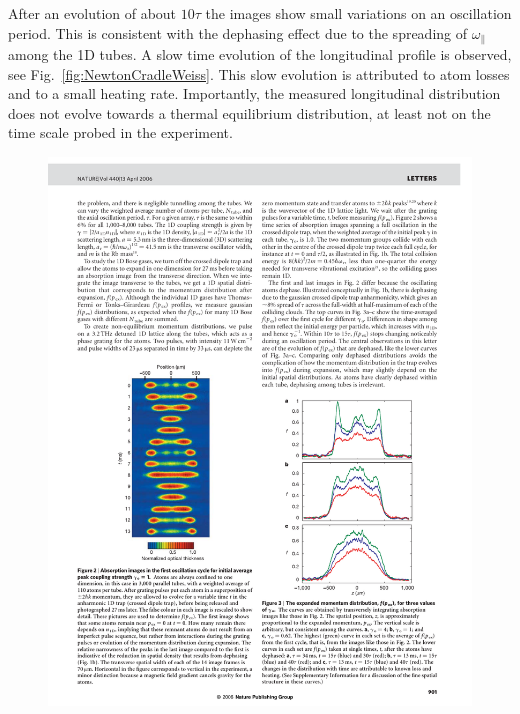 \documentclass[onecolumn,amsfonts,showpacs,superscriptaddress]{revtex4-1}
\begin{document}
After an evolution of about $10\tau$ the images show small variations on an oscillation period. This is consistent with the dephasing effect 
due to the spreading of $\omega_\parallel$ among the 1D tubes. A slow time evolution of the longitudinal profile is observed, see Fig.~\ref{fig:NewtonCradleWeiss}. 
This slow evolution is attributed to atom losses and to a small heating rate. 
Importantly, the measured longitudinal distribution does not evolve towards a thermal equilibrium distribution, at least not on the time scale probed in the experiment. 

\begin{figure}
    \centering
    \includegraphics[viewport=78 207 270 505,clip]{figures/NewtonCradleWeiss.pdf}
\end{figure}
\end{document}
